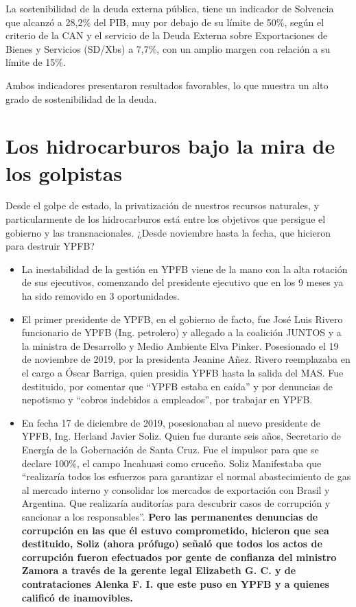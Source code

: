 \documentclass[a4paper, nobind]{templates/ociamthesis}
\begin{document}
La sostenibilidad de la deuda externa pública, tiene un indicador de Solvencia que alcanzó a 28,2\% del PIB, muy por debajo de su límite de 50\%, según el criterio de la CAN y el servicio de la Deuda Externa sobre Exportaciones de Bienes y Servicios (SD/Xbs) a 7,7\%, con un amplio margen con relación a su límite de 15\%.

Ambos indicadores presentaron resultados favorables, lo que muestra un alto grado de sostenibilidad de la deuda.

\hypertarget{los-hidrocarburos-bajo-la-mira-de-los-golpistas}{%
\chapter{Los hidrocarburos bajo la mira de los golpistas}\label{los-hidrocarburos-bajo-la-mira-de-los-golpistas}}

Desde el golpe de estado, la privatización de nuestros recursos naturales, y particularmente de los hidrocarburos está entre los objetivos que persigue el gobierno y las transnacionales. ¿Desde noviembre hasta la fecha, que hicieron para destruir YPFB?

\begin{itemize}
\item
  La inestabilidad de la gestión en YPFB viene de la mano con la alta rotación de sus ejecutivos, comenzando del presidente ejecutivo que en los 9 meses ya ha sido removido en 3 oportunidades.
\item
  El primer presidente de YPFB, en el gobierno de facto, fue José Luis Rivero funcionario de YPFB (Ing. petrolero) y allegado a la coalición JUNTOS y a la ministra de Desarrollo y Medio Ambiente Elva Pinker. Posesionado el 19 de noviembre de 2019, por la presidenta Jeanine Añez. Rivero reemplazaba en el cargo a Óscar Barriga, quien presidia YPFB hasta la salida del MAS. Fue destituido, por comentar que ``YPFB estaba en caída'' y por denuncias de nepotismo y ``cobros indebidos a empleados'', por trabajar en YPFB.
\item
  En fecha 17 de diciembre de 2019, posesionaban al nuevo presidente de YPFB, Ing. Herland Javier Soliz. Quien fue durante seis años, Secretario de Energía de la Gobernación de Santa Cruz. Fue el impulsor para que se declare 100\%, el campo Incahuasi como cruceño. Soliz Manifestaba que ``realizaría todos los esfuerzos para garantizar el normal abastecimiento de gas al mercado interno y consolidar los mercados de exportación con Brasil y Argentina. Que realizaría auditorías para descubrir casos de corrupción y sancionar a los responsables''. \textbf{Pero las permanentes denuncias de corrupción en las que él estuvo comprometido, hicieron que sea destituido, Soliz (ahora prófugo) señaló que todos los actos de corrupción fueron efectuados por gente de confianza del ministro Zamora a través de la gerente legal Elizabeth G. C. y de contrataciones Alenka F. I. que este puso en YPFB y a quienes calificó de inamovibles.}
\end{itemize}
\end{document}
